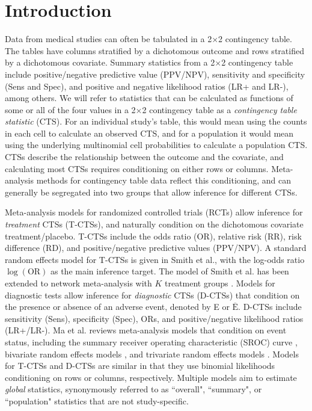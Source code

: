 \documentclass[AMA,STIX1COL]{WileyNJD-v2}
\newcommand{\Ebar}{\overline{\mbox{E}}}
\begin{document}
\doublespacing

\section{Introduction} \label{sec:intro}


Data from medical studies can often be tabulated in a 2$\times$2 contingency table. The tables have columns stratified by a dichotomous outcome and rows stratified by a dichotomous covariate. Summary statistics from a 2$\times$2 contingency table include positive/negative predictive value (PPV/NPV), sensitivity and specificity (Sens and Spec), and positive and negative likelihood ratios (LR+ and LR-), among others. We will refer to statistics that can be calculated as functions of some or all of the four values in a 2$\times$2 contingency table as a \textit{contingency table statistic} (CTS). For an individual study's table, this would mean using the counts in each cell to calculate an observed CTS, and for a population it would mean using the underlying multinomial cell probabilities to calculate a population CTS. CTSs describe the relationship between the outcome and the covariate, and calculating most CTSs requires conditioning on either rows or columns. Meta-analysis methods for contingency table data reflect this conditioning, and can generally be segregated into two groups that allow inference for different CTSs. 

Meta-analysis models for randomized controlled trials (RCTs) allow inference for \textit{treatment} CTSs (T-CTSs), and naturally condition on the dichotomous covariate treatment/placebo. T-CTSs include the odds ratio (OR), relative risk (RR), risk difference (RD), and positive/negative predictive values (PPV/NPV). A standard random effects model for T-CTSs is given in Smith et al.\cite{smith1995}, with the log-odds ratio $\log(\mbox{OR})$ as the main inference target. The model of Smith et al.\cite{smith1995} has been extended to network meta-analysis with $K$ treatment groups \cite{lu2004combination, dias2013synthesis, zhang2014network}. Models for diagnostic tests allow inference for \textit{diagnostic} CTSs (D-CTSs) that condition on the presence or absence of an adverse event, denoted by E or $\Ebar$. D-CTSs include sensitivity (Sens), specificity (Spec), ORs, and positive/negative likelihood ratios (LR+/LR-). Ma et al.\cite{ma2016multivariate} reviews meta-analysis models that condition on event status, including the summary receiver operating characteristic (SROC) curve \cite{rutter2001, moses1993, lian2019}, bivariate random effects models \cite{reitsma2005, chu2006, arends2008, chu2012bivariate, guo2017bivariate, hoyer2018meta}, and trivariate random effects models \cite{chu2009, ma2018network, wynants2018trivariate}. Models for T-CTSs and D-CTSs are similar in that they use binomial likelihoods conditioning on rows or columns, respectively. Multiple models \cite{chu2009, rutter2001, ma2018network} aim to estimate \textit{global} statistics, synonymously referred to as ``overall", ``summary", or ``population" statistics that are not study-specific. 
\end{document}
